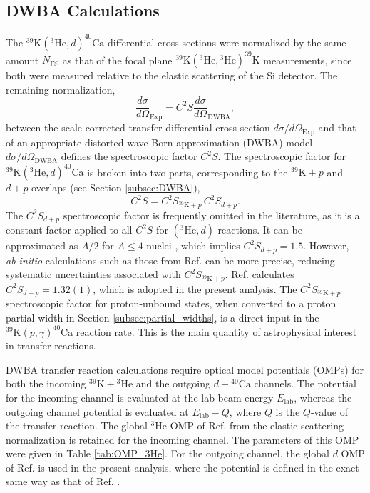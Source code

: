 \newpage

\subsection{DWBA Calculations} \label{subsec:DWBA_Cross}

The $^{39}\mathrm{K}(^{3}\mathrm{He},d)^{40}\mathrm{Ca}$ differential cross sections were normalized by the same amount $N_{\mathrm{ES}}$ as that of the focal plane $^{39}\mathrm{K}(^{3}\mathrm{He}, {}^{3}\mathrm{He})^{39}\mathrm{K}$ measurements, since both were measured relative to the elastic scattering of the Si detector. The remaining normalization,
\begin{equation} \label{eqn:spec_factor_dwba}
\frac{d\sigma}{d\Omega}_{\mathrm{Exp}} = C^{2}S \frac{d\sigma}{d\Omega}_{\mathrm{DWBA}},
\end{equation}
between the scale-corrected transfer differential cross section $d\sigma/d\Omega_{\mathrm{Exp}}$ and that of an appropriate distorted-wave Born approximation (DWBA) model $d\sigma/d\Omega_{\mathrm{DWBA}}$ defines the spectroscopic factor $C^{2}S$. The spectroscopic factor for $^{39}\mathrm{K}(^{3}\mathrm{He},d)^{40}\mathrm{Ca}$ is broken into two parts, corresponding to the $^{39}\mathrm{K}+p$ and $d+p$ overlaps (see Section \ref{subsec:DWBA}),
\begin{equation}
C^{2}S = C^{2}S_{^{39}\mathrm{K}+p} \, C^{2}S_{d+p}.
\end{equation}
The $C^{2}S_{d+p}$ spectroscopic factor is frequently omitted in the literature, as it is a constant factor applied to all $C^{2}S$ for $(^{3}\mathrm{He},d)$ reactions. It can be approximated as $A/2$ for $A \leq 4$ nuclei \cite{Satchler1983}, which implies $C^{2}S_{d+p} = 1.5$. However, \emph{ab-initio} calculations such as those from Ref. \cite{Brida2011} can be more precise, reducing systematic uncertainties associated with $C^{2}S_{^{39}\mathrm{K}+p}$. Ref. \cite{Brida2011} calculates $C^{2}S_{d+p} = 1.32(1)$, which is adopted in the present analysis. The $C^{2}S_{^{39}\mathrm{K}+p}$ spectroscopic factor for proton-unbound states, when converted to a proton partial-width in Section \ref{subsec:partial_widths}, is a direct input in the $^{39}\mathrm{K}(p,\gamma)^{40}\mathrm{Ca}$ reaction rate. This is the main quantity of astrophysical interest in transfer reactions.

DWBA transfer reaction calculations require optical model potentials (OMPs) for both the incoming $^{39}\mathrm{K} + {}^{3}\mathrm{He}$ and the outgoing $d + {}^{40}\mathrm{Ca}$ channels. The potential for the incoming channel is evaluated at the lab beam energy $E_{\mathrm{lab}}$, whereas the outgoing channel potential is evaluated at $E_{\mathrm{lab}} - Q$, where $Q$ is the $Q$-value of the transfer reaction. The global $^{3}$He OMP of Ref. \cite{Liang2009} from the elastic scattering normalization is retained for the incoming channel. The parameters of this OMP were given in Table \ref{tab:OMP_3He}. For the outgoing channel, the global $d$ OMP of Ref. \cite{An2006} is used in the present analysis, where the potential is defined in the exact same way as that of Ref. \cite{Liang2009}.

